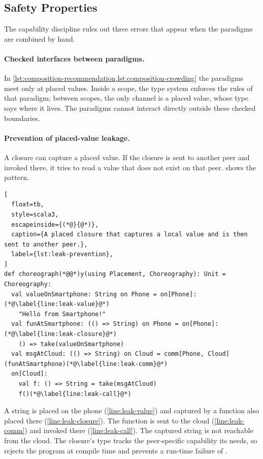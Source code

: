 \subsection{Safety Properties}
\label{subsec:capability-safety}

The capability discipline rules out three errors that appear when the paradigms are combined by hand.

\paragraph{Checked interfaces between paradigms.}
In \cref{lst:composition-recommendation,lst:composition-crowding} the paradigms meet only at placed values.
%
Inside a scope, the type system enforces the rules of that paradigm;
between scopes, the only channel is a placed value, whose type says where it lives.
%
The paradigms cannot interact directly outside these checked boundaries.

\paragraph{Prevention of placed-value leakage.}
A closure can capture a placed value.
If the closure is sent to another peer and invoked there,
it tries to read a value that does not exist on that peer.
%
 shows the pattern.

\begin{lstlisting}[
  float=tb,
  style=scala3,
  escapeinside={(*@}{@*)},
  caption={A placed closure that captures a local value and is then sent to another peer.},
  label={lst:leak-prevention},
]
def choreograph(*@@*)y(using Placement, Choreography): Unit = Choreography:
  val valueOnSmartphone: String on Phone = on[Phone]:(*@\label{line:leak-value}@*)
    "Hello from Smartphone!"
  val funAtSmartphone: (() => String) on Phone = on[Phone]:(*@\label{line:leak-closure}@*)
    () => take(valueOnSmartphone)
  val msgAtCloud: (() => String) on Cloud = comm[Phone, Cloud](funAtSmartphone)(*@\label{line:leak-comm}@*)
  on[Cloud]:
    val f: () => String = take(msgAtCloud)
    f()(*@\label{line:leak-call}@*)
\end{lstlisting}

A string is placed on the phone (\cref{line:leak-value}) and captured by a function also placed there (\cref{line:leak-closure}).
%
The function is sent to the cloud (\cref{line:leak-comm}) and invoked there (\cref{line:leak-call}).
The captured string is not reachable from the cloud.
%
The closure's type tracks the peer-specific capability its  needs,
so \camil rejects the program at compile time and prevents a run-time failure of .

